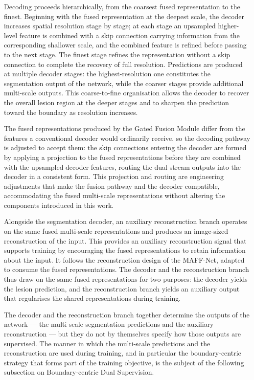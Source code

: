 Decoding proceeds hierarchically, from the coarsest fused representation to the finest. Beginning with the fused representation at the deepest scale, the decoder increases spatial resolution stage by stage; at each stage an upsampled higher-level feature is combined with a skip connection carrying information from the corresponding shallower scale, and the combined feature is refined before passing to the next stage. The finest stage refines the representation without a skip connection to complete the recovery of full resolution. Predictions are produced at multiple decoder stages: the highest-resolution one constitutes the segmentation output of the network, while the coarser stages provide additional multi-scale outputs. This coarse-to-fine organisation allows the decoder to recover the overall lesion region at the deeper stages and to sharpen the prediction toward the boundary as resolution increases.

The fused representations produced by the Gated Fusion Module differ from the features a conventional decoder would ordinarily receive, so the decoding pathway is adjusted to accept them: the skip connections entering the decoder are formed by applying a projection to the fused representations before they are combined with the upsampled decoder features, routing the dual-stream outputs into the decoder in a consistent form. This projection and routing are engineering adjustments that make the fusion pathway and the decoder compatible, accommodating the fused multi-scale representations without altering the components introduced in this work.

Alongside the segmentation decoder, an auxiliary reconstruction branch operates on the same fused multi-scale representations and produces an image-sized reconstruction of the input. This provides an auxiliary reconstruction signal that supports training by encouraging the fused representations to retain information about the input. It follows the reconstruction design of the MAFF-Net, adapted to consume the fused representations. The decoder and the reconstruction branch thus draw on the same fused representations for two purposes: the decoder yields the lesion prediction, and the reconstruction branch yields an auxiliary output that regularises the shared representations during training.

The decoder and the reconstruction branch together determine the outputs of the network --- the multi-scale segmentation predictions and the auxiliary reconstruction --- but they do not by themselves specify how those outputs are supervised. The manner in which the multi-scale predictions and the reconstruction are used during training, and in particular the boundary-centric strategy that forms part of the training objective, is the subject of the following subsection on Boundary-centric Dual Supervision.

